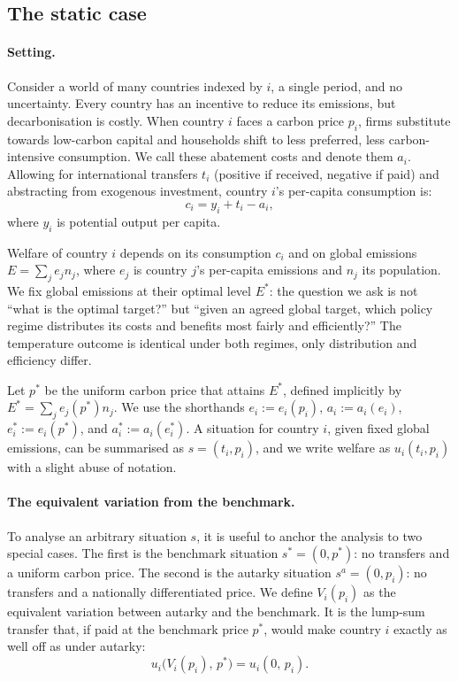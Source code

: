 \documentclass[12pt,english]{article}
\begin{document}
\subsection{The static case}
\label{sec:static}

\paragraph{Setting.}
Consider a world of many countries indexed by $i$, a single period, and no uncertainty. Every country has an incentive to reduce its emissions, but decarbonisation is costly. When country $i$ faces a carbon price $p_i$, firms substitute towards low-carbon capital and households shift to less preferred, less carbon-intensive consumption. We call these abatement costs and denote them $a_i$. Allowing for international transfers $t_i$ (positive if received, negative if paid) and abstracting from exogenous investment, country $i$'s per-capita consumption is:
\begin{equation}
    c_i = y_i + t_i - a_i,
\end{equation}
where $y_i$ is potential output per capita.

Welfare of country $i$ depends on its consumption $c_i$ and on global emissions $E = \sum_j e_j n_j$, where $e_j$ is country $j$'s per-capita emissions and $n_j$ its population. We fix global emissions at their optimal level $E^*$: the question we ask is not ``what is the optimal target?'' but ``given an agreed global target, which policy regime distributes its costs and benefits most fairly and efficiently?'' The temperature outcome is identical under both regimes, only distribution and efficiency differ.

Let $p^*$ be the uniform carbon price that attains $E^*$, defined implicitly by $E^* = \sum_j e_j(p^*) n_j$. We use the shorthands $e_i := e_i(p_i)$, $a_i := a_i(e_i)$, $e^*_i := e_i(p^*)$, and $a^*_i := a_i(e^*_i)$. A situation for country $i$, given fixed global emissions, can be summarised as $s = (t_i, p_i)$, and we write welfare as $u_i(t_i, p_i)$ with a slight abuse of notation.

\paragraph{The equivalent variation from the benchmark.} To analyse an arbitrary situation $s$, it is useful to anchor the analysis to two special cases. The first is the benchmark situation $s^* = (0, p^*)$: no transfers and a uniform carbon price. The second is the autarky situation $s^a = (0, p_i)$: no transfers and a nationally differentiated price. We define $V_i(p_i)$ as the equivalent variation between autarky and the benchmark. It is the lump-sum transfer that, if paid at the benchmark price $p^*$, would make country $i$ exactly as well off as under autarky:
\begin{equation}
    u_i\bigl(V_i(p_i),\, p^*\bigr) = u_i(0,\, p_i).
\end{equation}
\end{document}
